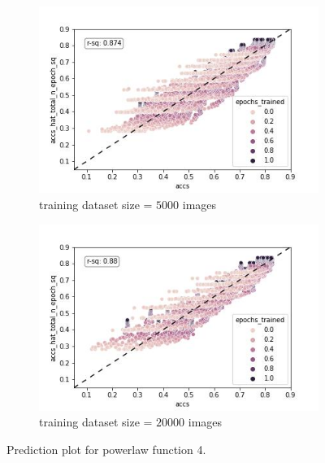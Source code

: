 \documentclass{article} %
\begin{document}
\begin{figure}
    \begin{subfigure}{.5\textwidth}
        \centering
        \includegraphics[width=.8\linewidth]{powerlaw_train_accs_hat_total_n_epoch_sq}
        \caption{training dataset size = $5000$ images}
        \label{fig:powerlaw_accs_hat_total_n_epoch_sq_train}
    \end{subfigure}%
    \begin{subfigure}{.5\textwidth}
        \centering
        \includegraphics[width=.8\linewidth]{powerlaw_val_accs_hat_total_n_epoch_sq}
        \caption{training dataset size = $20000$ images}
        \label{fig:powerlaw_accs_hat_total_n_epoch_sq_val}
    \end{subfigure}
    \caption{Prediction plot for powerlaw function 4.}
    \label{fig:powerlaw_accs_hat_total_n_epoch_sq}
\end{figure}
\end{document}
